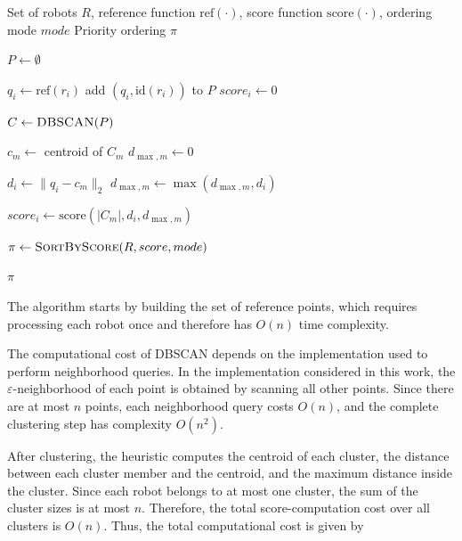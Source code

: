 \begin{algorithm}[H]
\caption{Spatial Cluster-Based Heuristic}
\label{alg:spatial_cluster_based}
\footnotesize
\begin{algorithmic}[1]
\Require Set of robots $R$, reference function $\mathrm{ref}(\cdot)$, score function $\mathrm{score}(\cdot)$, ordering mode $mode$
\Ensure Priority ordering $\pi$

\State $P \gets \emptyset$ 

    \State $q_i \gets \mathrm{ref}(r_i)$ 
    \State add $(q_i, \mathrm{id}(r_i))$ to $P$
    \State $score_i \gets 0$
\EndFor

\State $C \gets \textsc{DBSCAN}(P)$ 

    \State $c_m \gets$ centroid of $C_m$
    \State $d_{\max,m} \gets 0$

        \State $d_i \gets \|q_i - c_m\|_2$
        \State $d_{\max,m} \gets \max(d_{\max,m}, d_i)$
    \EndFor

        \State $score_i \gets \mathrm{score}(|C_m|, d_i, d_{\max,m})$
    \EndFor
\EndFor

\State $\pi \gets \textsc{SortByScore}(R, score, mode)$

\State \Return $\pi$
\end{algorithmic}
\end{algorithm}



The algorithm starts by building the set of reference points, which requires processing each robot once and therefore has \(O(n)\) time complexity.

The computational cost of DBSCAN depends on the implementation used to perform neighborhood queries. In the implementation considered in this work, the \(\varepsilon\)-neighborhood of each point is obtained by scanning all other points. Since there are at most \(n\) points, each neighborhood query costs \(O(n)\), and the complete clustering step has complexity \(O(n^2)\).

After clustering, the heuristic computes the centroid of each cluster, the distance between each cluster member and the centroid, and the maximum distance inside the cluster. Since each robot belongs to at most one cluster, the sum of the cluster sizes is at most \(n\). Therefore, the total score-computation cost over all clusters is \(O(n)\). Thus, the total computational cost is given by

